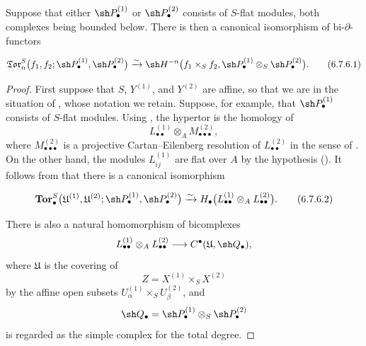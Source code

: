 \begin{proposition}[6.7.6]
\label{III.6.7.6}
Suppose that either $\sh P_\bullet^{(1)}$ or
$\sh P_\bullet^{(2)}$ consists of $S$-flat modules, both
complexes being bounded below.  There is then a canonical
isomorphism of bi-$\partial$-functors
\begin{env}[6.7.6.1]
\label{III.6.7.6.1}
\[
  \mathfrak{Tor}_n^S
  \bigl(
    f_1,f_2;
    \sh P_\bullet^{(1)},\sh P_\bullet^{(2)}
  \bigr)
  \xrightarrow{\sim}
  \sh H^{-n}
  \bigl(
    f_1\times_Sf_2,
    \sh P_\bullet^{(1)}
    \otimes_S\sh P_\bullet^{(2)}
  \bigr).
  \tag{6.7.6.1}\label{III.6.7.6.1.eq}
\]
\end{env}
\end{proposition}

\begin{proof}
First suppose that $S$, $Y^{(1)}$, and $Y^{(2)}$ are affine, so
that we are in the situation of , whose notation
we retain.  Suppose, for example, that
$\sh P_\bullet^{(1)}$ consists of $S$-flat modules.  Using
, the hypertor is the homology of
\[
  L_{\bullet\bullet}^{(1)}
  \otimes_A M_{\bullet\bullet\bullet}^{(2)},
\]
where $M_{\bullet\bullet\bullet}^{(2)}$ is a projective
Cartan--Eilenberg resolution of $L_{\bullet\bullet}^{(2)}$ in
the sense of .  On the other hand, the modules
$L_{ij}^{(1)}$ are flat over $A$ by the hypothesis
().  It follows from
 that there is a canonical isomorphism
\begin{env}[6.7.6.2]
\label{III.6.7.6.2}
\[
  \mathbf{Tor}_\bullet^S
  \bigl(
    \mathfrak U^{(1)},\mathfrak U^{(2)};
    \sh P_\bullet^{(1)},\sh P_\bullet^{(2)}
  \bigr)
  \xrightarrow{\sim}
  H_\bullet
  \bigl(
    L_{\bullet\bullet}^{(1)}
    \otimes_A L_{\bullet\bullet}^{(2)}
  \bigr).
  \tag{6.7.6.2}\label{III.6.7.6.2.eq}
\]
\end{env}

There is also a natural homomorphism of bicomplexes
\[
  L_{\bullet\bullet}^{(1)}
  \otimes_A L_{\bullet\bullet}^{(2)}
  \longrightarrow
  C^\bullet(\mathfrak U,\sh Q_\bullet),
\]
where $\mathfrak U$ is the covering of
\[
  Z=X^{(1)}\times_SX^{(2)}
\]
by the affine open subsets
$U_\alpha^{(1)}\times_SU_\beta^{(2)}$, and
\[
  \sh Q_\bullet
  =
  \sh P_\bullet^{(1)}
  \otimes_S\sh P_\bullet^{(2)}
\]
is regarded as the simple complex for the total degree.



\end{proof}

